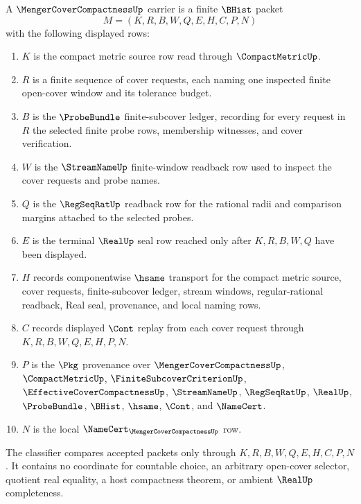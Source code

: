 \begin{definition}
\label{def:menger-cover-compactness-carrier}
A $\MengerCoverCompactnessUp$ carrier is a finite $\BHist$ packet
$$
M=(K,R,B,W,Q,E,H,C,P,N)
$$
with the following displayed rows:
\begin{enumerate}
\item $K$ is the compact metric source row read through $\CompactMetricUp$.
\item $R$ is a finite sequence of cover requests, each naming one inspected finite open-cover window and its tolerance budget.
\item $B$ is the $\ProbeBundle$ finite-subcover ledger, recording for every request in $R$ the selected finite probe rows, membership witnesses, and cover verification.
\item $W$ is the $\StreamNameUp$ finite-window readback row used to inspect the cover requests and probe names.
\item $Q$ is the $\RegSeqRatUp$ readback row for the rational radii and comparison margins attached to the selected probes.
\item $E$ is the terminal $\RealUp$ seal row reached only after $K,R,B,W,Q$ have been displayed.
\item $H$ records componentwise $\hsame$ transport for the compact metric source, cover requests, finite-subcover ledger, stream windows, regular-rational readback, Real seal, provenance, and local naming rows.
\item $C$ records displayed $\Cont$ replay from each cover request through $K,R,B,W,Q,E,H,P,N$.
\item $P$ is the $\Pkg$ provenance over $\MengerCoverCompactnessUp$, $\CompactMetricUp$, $\FiniteSubcoverCriterionUp$, $\EffectiveCoverCompactnessUp$, $\StreamNameUp$, $\RegSeqRatUp$, $\RealUp$, $\ProbeBundle$, $\BHist$, $\hsame$, $\Cont$, and $\NameCert$.
\item $N$ is the local $\NameCert_{\MengerCoverCompactnessUp}$ row.
\end{enumerate}
The classifier compares accepted packets only through $K,R,B,W,Q,E,H,C,P,N$. It contains no coordinate for countable choice, an arbitrary open-cover selector, quotient real equality, a host compactness theorem, or ambient $\RealUp$ completeness.
\end{definition}


